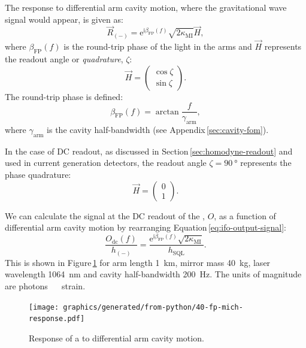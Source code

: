 The response to differential arm cavity motion, where the gravitational wave signal would appear, is given as:
\begin{equation}
  \label{eq:fp-mich-response}
  \vec{R}_{\left( - \right)} = \text{e}^{\text{i} \beta_{\text{FP}} \left( f \right)} \sqrt{2 \kappa_{\text{MI}}} \vec{H},
\end{equation}
where $\beta_{\text{FP}} \left( f \right)$ is the round-trip phase of the light in the arms and $\vec{H}$ represents the readout angle or \emph{quadrature}, $\zeta$:
\begin{equation}
  \vec{H} =
  \begin{pmatrix}
    \cos \zeta \\
    \sin \zeta
  \end{pmatrix}.
\end{equation}
The round-trip phase is defined:
\begin{equation}
  \beta_{\text{FP}} \left( f \right) = \arctan{\frac{f}{\gamma_{\text{arm}}}},
\end{equation}
where $\gamma_{\text{arm}}$ is the \FP{} cavity half-bandwidth (see Appendix\,\ref{sec:cavity-fom}).

In the case of \gls{DC} readout, as discussed in Section\,\ref{sec:homodyne-readout} and used in current generation detectors, the readout angle $\zeta = \SI{90}{\degree}$ represents the phase quadrature:
\begin{equation}
  \vec{H} =
  \begin{pmatrix}
    0 \\
    1
  \end{pmatrix}.
\end{equation}

We can calculate the signal at the \gls{DC} readout of the \FPMI{}, $O$, as a function of differential arm cavity motion by rearranging Equation\,\ref{eq:ifo-output-signal}:
\begin{equation}
  \frac{O_{\text{dc}} \left( f \right)}{h_{\left( - \right)}} = \frac{\text{e}^{\text{i} \beta_{\text{FP}} \left( f \right)} \sqrt{2 \kappa_{\text{MI}}}}{h_{\text{SQL}}}.
\end{equation}
This is shown in Figure\,\ref{fig:fp-mich-response} for arm length \SI{1}{\kilo\meter}, mirror mass \SI{40}{\kilo\gram}, laser wavelength \SI{1064}{\nano\meter} and cavity half-bandwidth \SI{200}{\hertz}. The units of magnitude are photons \SI{}{\per\sqrthz} strain.

\begin{figure}
  \centering
  \texttt{[image: graphics/generated/from-python/40-fp-mich-response.pdf]}
  \caption[Response of a \FPMI{} to differential arm cavity motion]{\label{fig:fp-mich-response}Response of a \FPMI{} to differential arm cavity motion.}
\end{figure}

